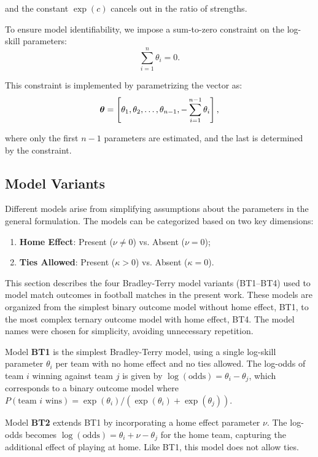 \noindent and the constant $\exp(c)$ cancels out in the ratio of strengths.

To ensure model identifiability, we impose a sum-to-zero constraint on the log-skill parameters:
\begin{equation}
    \label{eq:sum_zero_cons_bt}
    \sum_{i=1}^{n} \theta_i = 0.
\end{equation}

This constraint is implemented by parametrizing the vector as:
\begin{equation}
    \boldsymbol{\theta} = \left[{\theta_1, \theta_2, \ldots, \theta_{n-1}, -\sum_{i=1}^{n-1} \theta_i}\right],
\end{equation}

\noindent where only the first $n-1$ parameters are estimated, and the last is determined by the constraint.

\subsection{Model Variants}
\label{sec:BT_model_variants}

Different models arise from simplifying assumptions about the parameters in the general formulation.
The models can be categorized based on two key dimensions:
\begin{enumerate}
    \item \textbf{Home Effect}: Present ($\nu \neq 0$) vs. Absent ($\nu = 0$);
    \item \textbf{Ties Allowed}: Present ($\kappa > 0$) vs. Absent ($\kappa = 0$).
\end{enumerate}

This section describes the four Bradley-Terry model variants (BT1--BT4) used to model match outcomes in football matches in the present work.
These models are organized from the simplest binary outcome model without home effect, BT1, to the most complex ternary outcome model with home effect, BT4.
The model names were chosen for simplicity, avoiding unnecessary repetition.

Model \textbf{BT1} is the simplest Bradley-Terry model, using a single log-skill parameter $\theta_i$ per team with no home effect and no ties allowed.
The log-odds of team $i$ winning against team $j$ is given by $\log(\text{odds}) = \theta_i - \theta_j$, which corresponds to a binary outcome model where $P(\text{team } i \text{ wins}) = \exp(\theta_i) / (\exp(\theta_i) + \exp(\theta_j))$.

Model \textbf{BT2} extends BT1 by incorporating a home effect parameter $\nu$.
The log-odds becomes $\log(\text{odds}) = \theta_i + \nu - \theta_j$ for the home team, capturing the additional effect of playing at home.
Like BT1, this model does not allow ties.

